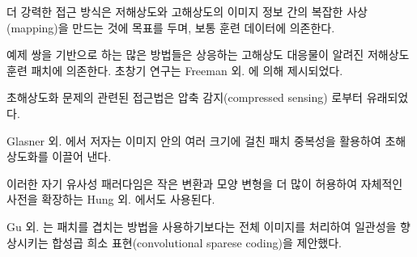 \documentclass[10pt,twocolumn,letterpaper]{article}
\newcommand{\kor}[1]{#1}
\newcommand{\eng}[1]{}
\begin{document}
\eng{
More powerful approaches aim to establish a complex mapping between low- and high-resolution image information and usually rely on training data.
}\kor{
더 강력한 접근 방식은 저해상도와 고해상도의 이미지 정보 간의 복잡한 사상(mapping)을 만드는 것에 목표를 두며, 보통 훈련 데이터에 의존한다.
}\eng{
Many methods that are based on example-pairs rely on \ac{LR} training patches for which the corresponding \ac{HR} counterparts are known. Early work was presented by Freeman et al. \cite{Freeman2000,Freeman2002}.
}\kor{
예제 쌍을 기반으로 하는 많은 방법들은 상응하는 \ac{고해상도} 대응물이 알려진 \ac{저해상도} 훈련 패치에 의존한다. 초창기 연구는 Freeman 외. \cite{Freeman2000,Freeman2002}에 의해 제시되었다.
}\eng{
Related approaches to the \ac{SR} problem originate in compressed sensing \cite{Yang08, Dong2011, zeyde2012single}.
}\kor{
\ac{초해상도화} 문제의 관련된 접근법은 압축 감지(compressed sensing) \cite{Yang08, Dong2011, zeyde2012single}로부터 유래되었다.
}
    \eng{
    In Glasner et al. \cite{glasner2009super} the authors exploit patch redundancies across scales within the image to drive the \ac{SR}.
    }\kor{
    Glasner 외. \cite{glasner2009super}에서 저자는 이미지 안의 여러 크기에 걸친 패치 중복성을 활용하여 \ac{초해상도화}를 이끌어 낸다.
    } \eng{
    This paradigm of self-similarity is also employed in Huang et al. \cite{Huang15selfexemplars}, where self dictionaries are extended by further allowing for small transformations and shape variations.
    }\kor{
    이러한 자기 유사성 패러다임은 작은 변환과 모양 변형을 더 많이 허용하여 자체적인 사전을 확장하는 Hung 외. \cite{Huang15selfexemplars}에서도 사용된다.
    }
\eng{
Gu et al. \cite{gu2015convolutional} proposed a convolutional sparse coding approach that improves consistency by processing the whole image rather than overlapping patches.
}\kor{
Gu 외. \cite{gu2015convolutional}는 패치를 겹치는 방법을 사용하기보다는 전체 이미지를 처리하여 일관성을 향상시키는 합성곱 희소 표현(convolutional sparese coding)을 제안했다.
}
\end{document}
